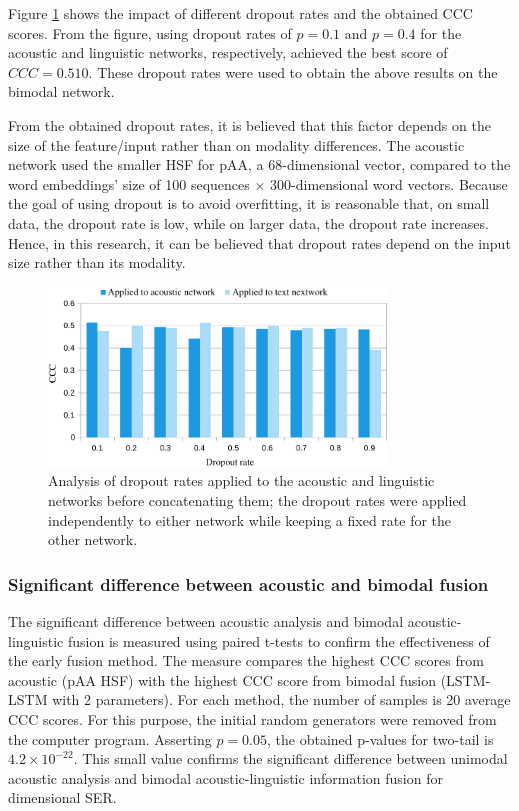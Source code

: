 Figure \ref{fig:dropout} shows the impact of different dropout rates and the
obtained CCC scores. From the figure, using dropout rates of $p=0.1$ and
$p=0.4$ for the acoustic and linguistic networks, respectively, achieved the
best score of $CCC=0.510$. These dropout rates were used to obtain the above
results on the bimodal network. 

From the obtained dropout rates, it is believed that this factor depends on the
size of the feature/input rather than on modality differences. The acoustic
network used the smaller HSF for pAA, a 68-dimensional vector,  compared to the
word embeddings' size of 100 sequences $\times$ 300-dimensional word vectors.
Because the goal of using dropout is to avoid overfitting, it is reasonable
that, on small data, the dropout rate is low, while on larger data, the dropout
rate increases. Hence, in this research, it can be believed that dropout rates
depend on the input size rather than its modality.

\begin{figure}[htpb]
\centering
\includegraphics[width=0.8\textwidth]{../fig/dropout_v2.pdf}
\caption{Analysis of dropout rates applied to the acoustic and linguistic networks before concatenating them; the dropout rates were applied independently to either network while keeping a fixed rate for the other network.} 
\label{fig:dropout}
\end{figure}

\subsubsection{Significant difference between acoustic and bimodal fusion}
The significant difference between acoustic analysis and bimodal
acoustic-linguistic fusion is measured using paired t-tests to confirm the
effectiveness of the early fusion method. The measure compares the highest CCC
scores from acoustic (pAA HSF) with the highest CCC score from bimodal fusion
(LSTM-LSTM with 2 parameters). For each method, the number of samples is 20
average CCC scores. For this purpose, the initial random generators were
removed from the computer program. Asserting $p = 0.05$, the obtained p-values
for two-tail is $4.2\times 10^{-22}$. This small value confirms the significant
difference between unimodal acoustic analysis and bimodal acoustic-linguistic
information fusion for dimensional SER.

